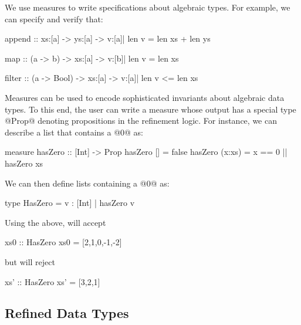 We use measures to write specifications about algebraic types. 
For example, we can specify and verify that: 
%
\begin{code}
  append :: xs:[a] -> ys:[a] 
         -> {v:[a]| len v = len xs + len ys}

  map    :: (a -> b) -> xs:[a] 
         -> {v:[b]| len v = len xs} 

  filter :: (a -> Bool) -> xs:[a] 
         -> {v:[a]| len v <= len xs}
\end{code}

Measures can be used to encode sophisticated 
invariants about algebraic data types.
%
To this end, the user can write a measure whose output has a special type 
@Prop@ denoting propositions in the refinement logic. For instance, we can
describe a list that contains a @0@ as:
%
\begin{code}
  measure hasZero :: [Int] -> Prop
  hasZero []      = false
  hasZero (x:xs)  = x == 0 || hasZero xs
\end{code}
%
We can then define lists containing a @0@ as:
%
\begin{code}
  type HasZero = {v : [Int] | hasZero v } 
\end{code}
%
Using the above, \toolname will accept 
%
\begin{code}
  xs0 :: HasZero 
  xs0 = [2,1,0,-1,-2]
\end{code}
%
but will reject
%
\begin{code}
  xs' :: HasZero 
  xs' = [3,2,1]
\end{code}



\subsection{Refined Data Types}

